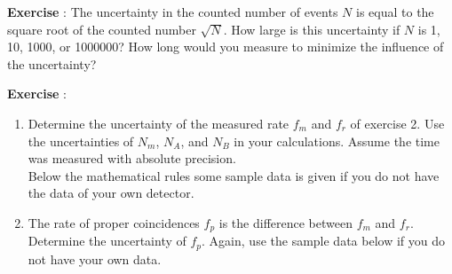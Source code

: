 \documentclass[12pt,a4paper]{article}
\numberwithin{equation}{section}
\numberwithin{figure}{section}
\newcounter{Exercise}
\numberwithin{table}{section}
\begin{document}
\begin{shaded}
\textbf{Exercise \theExercise {}} : The uncertainty in the counted number of events $N$ is equal to the square root of the counted number $\sqrt{N}$. How large is this uncertainty if $N$ is 1, 10, 1000, or 1000000? How long would you measure to minimize the influence of the uncertainty?\end{shaded}

\begin{shaded}
\textbf{Exercise \theExercise {}} :
\begin{enumerate}[-]
\item Determine the uncertainty of the measured rate $f_m$ and $f_r$ of exercise 2. Use the uncertainties of $N_m$, $N_A$, and $N_B$ in your calculations. Assume the time was measured with absolute precision.\footnotemark \\
Below the mathematical rules some sample data is given if you do not have the data of your own detector.
\item The rate of proper coincidences $f_p$ is the difference between $f_m$ and $f_r$. Determine the uncertainty of $f_p$. Again, use the sample data below if you do not have your own data.
\end{enumerate}\end{shaded}

\end{document}
